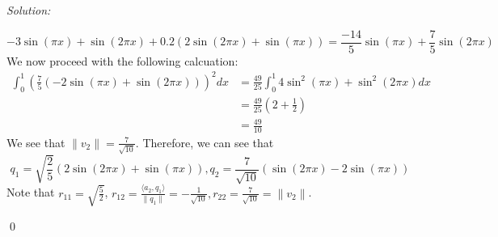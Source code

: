 \documentclass[12pt]{article}
\newenvironment{sol}
    {\emph{Solution:}
    }
    {
    \qed
    }
\begin{document}
\begin{sol}
    \[
    -3 \sin (\pi x) + \sin(2\pi x) + 0.2 (2 \sin(2\pi x) + \sin(\pi x)) = \frac{-14}{5} \sin(\pi x) + \frac{7}{5} \sin(2\pi x)
    \] 
    We now proceed with the following calcuation:
    \begin{align*}
        \int_{0}^{1} \left( \frac{7}{5} (-2\sin(\pi x) + \sin(2 \pi x)) \right)^2 dx &= \frac{49}{25} \int_{0}^{1} 4\sin^2 (\pi x) + \sin^2(2\pi x) dx \\
        &=  \frac{49}{25} \left( 2 + \frac{1}{2} \right)\\
        &= \frac{49}{10}
    \end{align*}
    We see that $\| v_2\| = \frac{7}{\sqrt{10}}$. Therefore, we can see that 
    \[
    q_1 = \sqrt{\frac{2}{5}} (2\sin (2\pi x) + \sin(\pi x)), q_2 = \frac{7}{\sqrt{10}} \left( \sin(2 \pi x) - 2\sin(\pi x) \right)
    \]
    Note that $r_{11} = \sqrt{\frac{5}{2}}$, $r_{12} = \frac{\langle a_2, q_1 \rangle}{\|q_1\|} = -\frac{1}{\sqrt{10}}, r_{22} = \frac{7}{\sqrt{10}} = \|v_2\|$. 
\end{sol}
\end{document}
